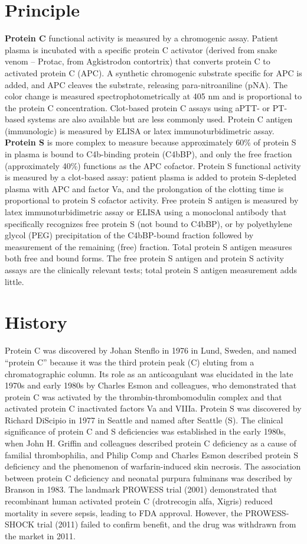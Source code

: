 \section*{Principle}
\textbf{Protein C} functional activity is measured by a chromogenic assay. Patient plasma is incubated with a specific protein C activator (derived from snake venom -- Protac, from Agkistrodon contortrix) that converts protein C to activated protein C (APC). A synthetic chromogenic substrate specific for APC is added, and APC cleaves the substrate, releasing para-nitroaniline (pNA). The color change is measured spectrophotometrically at 405 nm and is proportional to the protein C concentration. Clot-based protein C assays using aPTT- or PT-based systems are also available but are less commonly used. Protein C antigen (immunologic) is measured by ELISA or latex immunoturbidimetric assay. \textbf{Protein S} is more complex to measure because approximately 60\% of protein S in plasma is bound to C4b-binding protein (C4bBP), and only the free fraction (approximately 40\%) functions as the APC cofactor. Protein S functional activity is measured by a clot-based assay: patient plasma is added to protein S-depleted plasma with APC and factor Va, and the prolongation of the clotting time is proportional to protein S cofactor activity. Free protein S antigen is measured by latex immunoturbidimetric assay or ELISA using a monoclonal antibody that specifically recognizes free protein S (not bound to C4bBP), or by polyethylene glycol (PEG) precipitation of the C4bBP-bound fraction followed by measurement of the remaining (free) fraction. Total protein S antigen measures both free and bound forms. The free protein S antigen and protein S activity assays are the clinically relevant tests; total protein S antigen measurement adds little.

\section*{History}
Protein C was discovered by Johan Stenflo in 1976 in Lund, Sweden, and named ``protein C'' because it was the third protein peak (C) eluting from a chromatographic column. Its role as an anticoagulant was elucidated in the late 1970s and early 1980s by Charles Esmon and colleagues, who demonstrated that protein C was activated by the thrombin-thrombomodulin complex and that activated protein C inactivated factors Va and VIIIa. Protein S was discovered by Richard DiScipio in 1977 in Seattle and named after Seattle (S). The clinical significance of protein C and S deficiencies was established in the early 1980s, when John H. Griffin and colleagues described protein C deficiency as a cause of familial thrombophilia, and Philip Comp and Charles Esmon described protein S deficiency and the phenomenon of warfarin-induced skin necrosis. The association between protein C deficiency and neonatal purpura fulminans was described by Branson in 1983. The landmark PROWESS trial (2001) demonstrated that recombinant human activated protein C (drotrecogin alfa, Xigris) reduced mortality in severe sepsis, leading to FDA approval. However, the PROWESS-SHOCK trial (2011) failed to confirm benefit, and the drug was withdrawn from the market in 2011.

